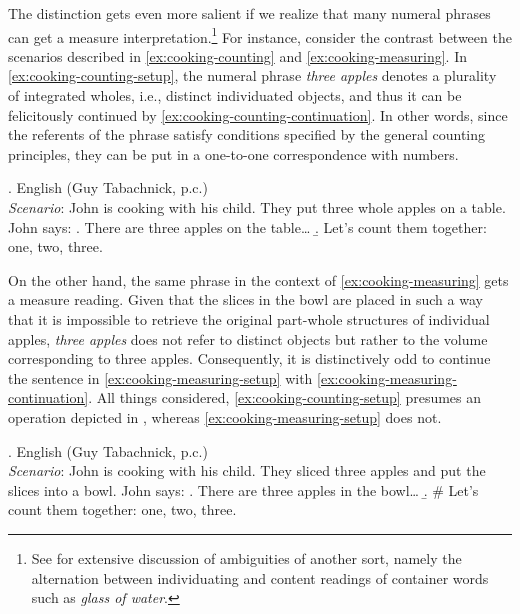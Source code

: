 The distinction gets even more salient if we realize that many numeral phrases can get a measure interpretation.\footnote{See \citet[p. 3]{rothstein2017semantics} for extensive discussion of ambiguities of another sort, namely the alternation between individuating and content readings of container words such as \textit{glass of water}.} For instance, consider the contrast between the scenarios described in \ref{ex:cooking-counting} and \ref{ex:cooking-measuring}. In \ref{ex:cooking-counting-setup}, the numeral phrase \textit{three apples} denotes a plurality of integrated wholes, i.e., distinct individuated objects, and thus it can be felicitously continued by \ref{ex:cooking-counting-continuation}. In other words, since the referents of the phrase satisfy conditions specified by the general counting principles, they can be put in a one-to-one correspondence with numbers.  

\ex. English (Guy Tabachnick, p.c.)\\
\textit{Scenario}: John is cooking with his child. They put three whole apples on a table. John says:\label{ex:cooking-counting}
\a. There are three apples on the table\dots\label{ex:cooking-counting-setup}
\b. Let's count them together: one, two, three.\label{ex:cooking-counting-continuation}

On the other hand, the same phrase in the context of \ref{ex:cooking-measuring} gets a measure reading. Given that the slices in the bowl are placed in such a way that it is impossible to retrieve the original part-whole structures of individual apples, \textit{three apples} does not refer to distinct objects but rather to the volume corresponding to three apples. Consequently, it is distinctively odd to continue the sentence in \ref{ex:cooking-measuring-setup} with \ref{ex:cooking-measuring-continuation}. All things considered, \ref{ex:cooking-counting-setup} presumes an operation depicted in , whereas \ref{ex:cooking-measuring-setup} does not.

\ex. English (Guy Tabachnick, p.c.)\\
\textit{Scenario}: John is cooking with his child. They sliced three apples and put the slices into a bowl. John says:\label{ex:cooking-measuring}
\a. There are three apples in the bowl\dots\label{ex:cooking-measuring-setup}
\b. \# Let's count them together: one, two, three.\label{ex:cooking-measuring-continuation}

